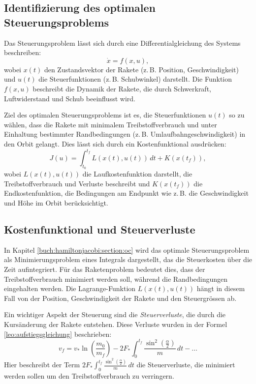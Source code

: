 \subsection{Identifizierung des optimalen Steuerungsproblems}

Das Steuerungsproblem lässt sich durch eine Differentialgleichung des Systems beschreiben:
\[
\dot{x} = f(x,u),
\]
wobei \(x(t)\) den Zustandsvektor der Rakete (z.\,B. Position, Geschwindigkeit) und \(u(t)\) die Steuerfunktionen (z.\,B. Schubwinkel) darstellt. 
Die Funktion \(f(x,u)\) beschreibt die Dynamik der Rakete, die durch Schwerkraft, Luftwiderstand und Schub beeinflusst wird.

Ziel des optimalen Steuerungsproblems ist es, die Steuerfunktionen \(u(t)\) so zu wählen, dass die Rakete mit minimalem Treibstoffverbrauch und unter Einhaltung bestimmter Randbedingungen (z.\,B. Umlaufbahngeschwindigkeit) in den Orbit gelangt. 
Dies lässt sich durch ein Kostenfunktional ausdrücken:
\[
J(u) = \int_{t_0}^{t_f} L(x(t), u(t))\, dt + K(x(t_f)),
\]
wobei \(L(x(t), u(t))\) die Laufkostenfunktion darstellt, die Treibstoffverbrauch und Verluste beschreibt und \(K(x(t_f))\) die Endkostenfunktion, die Bedingungen am Endpunkt wie z.\,B. die Geschwindigkeit und Höhe im Orbit berücksichtigt.

\subsection{Kostenfunktional und Steuerverluste}

In Kapitel \ref{buch:hamiltonjacobi:section:oc} wird das optimale Steuerungsproblem als Minimierungsproblem eines Integrals dargestellt, das die Steuerkosten über die Zeit aufintegriert. 
Für das Raketenproblem bedeutet dies, dass der Treibstoffverbrauch minimiert werden soll, während die Randbedingungen eingehalten werden. 
Die Lagrange-Funktion \(L(x(t), u(t))\) hängt in diesem Fall von der Position, Geschwindigkeit der Rakete und den Steuergrössen ab.

Ein wichtiger Aspekt der Steuerung sind die \textit{Steuerverluste}, die durch die Kursänderung der Rakete entstehen. Diese Verluste wurden in der Formel \eqref{leo:aufstiegsgleichung} beschrieben:
\[
v_f = v_* \ln \left(\frac{m_0}{m_f}\right) - 2F_* \int_0^{t_f} \frac{\sin^2\left(\frac{\alpha}{2}\right)}{m} \, dt - \dots
\]
Hier beschreibt der Term \(2F_* \int_0^{t_f} \frac{\sin^2\left(\frac{\alpha}{2}\right)}{m} \, dt\) die Steuerverluste, die minimiert werden sollen um den Treibstoffverbrauch zu verringern.

